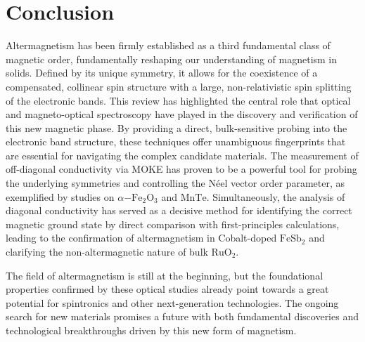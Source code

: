 \documentclass{article}
\begin{document}
\section{Conclusion}
Altermagnetism has been firmly established as a third fundamental class of magnetic order, fundamentally reshaping our understanding of magnetism in solids. Defined by its unique symmetry, it allows for the coexistence of a compensated, collinear spin structure with a large, non-relativistic spin splitting of the electronic bands. This review has highlighted the central role that optical and magneto-optical spectroscopy have played in the discovery and verification of this new magnetic phase.
By providing a direct, bulk-sensitive probing into the electronic band structure, these techniques offer unambiguous fingerprints that are essential for navigating the complex candidate materials. The measurement of off-diagonal conductivity via MOKE has proven to be a powerful tool for probing the underlying symmetries and controlling the Néel vector order parameter, as exemplified by studies on \(\alpha\mathrm{-Fe}_2\mathrm{O}_3\) and \(\mathrm{MnTe}\). Simultaneously, the analysis of diagonal conductivity has served as a decisive method for identifying the correct magnetic ground state by direct comparison with first-principles calculations, leading to the confirmation of altermagnetism in Cobalt-doped \(\mathrm{FeSb}_2\) and clarifying the non-altermagnetic nature of bulk \(\mathrm{RuO}_2\).

The field of altermagnetism is still at the beginning, but the foundational properties confirmed by these optical studies already point towards a great potential for spintronics and other next-generation technologies. The ongoing search for new materials promises a future with both fundamental discoveries and technological breakthroughs driven by this new form of magnetism.
\end{document}
